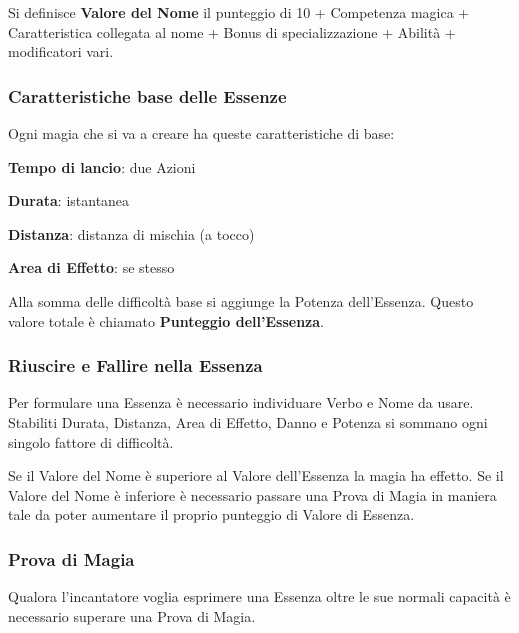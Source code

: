\documentclass[a4paper,twoside,openany]{book}
\begin{document}
\begin{multicols}{2}
Si definisce \textbf{Valore del Nome} il punteggio di 10 + Competenza magica + Caratteristica collegata al nome + Bonus di specializzazione + Abilità + modificatori vari.

\subsubsection{Caratteristiche base delle Essenze}

\label{caratteristiche-base-delle-essenze}

Ogni magia che si va a creare ha queste caratteristiche di base:

\smallskip

\textbf{Tempo di lancio}: due Azioni

\textbf{Durata}: istantanea

\textbf{Distanza}: distanza di mischia (a tocco)

\textbf{Area di Effetto}: se stesso

Alla somma delle difficoltà base si aggiunge la Potenza dell'Essenza. Questo valore totale è chiamato \textbf{Punteggio dell'Essenza}.

\subsubsection{Riuscire e Fallire nella Essenza}

\label{riuscire-e-fallire-nella-prova-di-magia}

Per formulare una Essenza è necessario individuare Verbo e Nome da usare.
Stabiliti Durata, Distanza, Area di Effetto, Danno e Potenza si sommano ogni singolo fattore di difficoltà.

Se il Valore del Nome è superiore al Valore dell'Essenza la magia ha effetto. Se il Valore del Nome è inferiore è necessario passare una Prova di Magia in maniera tale da poter aumentare il proprio punteggio di Valore di Essenza.

\subsubsection{Prova di Magia}\label{magieprovadimagia}

Qualora l'incantatore voglia esprimere una Essenza oltre le sue normali capacità è necessario superare una Prova di Magia.


\end{multicols}
\end{document}
